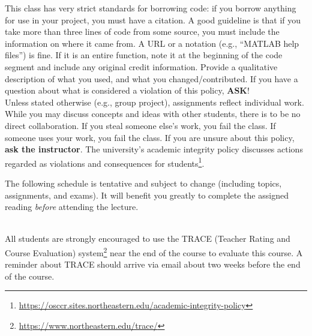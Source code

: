 \documentclass{neu_syllabus}
\begin{document}
This class has very strict standards for borrowing code: if you borrow anything for use in your project, you must have a citation.
A good guideline is that if you take more than three lines of code from some source, you must include the information on where it came from.
A URL or a notation (e.g., ``MATLAB help files'') is fine.
If it is an entire function, note it at the beginning of the code segment and include any original credit information.
Provide a qualitative description of what you used, and what you changed/contributed.
If you have a question about what is considered a violation of this policy, \textbf{ASK}!
\\

Unless stated otherwise (e.g., group project), assignments reflect individual work.
While you may discuss concepts and ideas with other students, there is to be no direct collaboration.
If you steal someone else's work, you fail the class.
If someone uses your work, you fail the class.
If you are unsure about this policy, \textbf{ask the instructor}.
The university's academic integrity policy discusses actions regarded as violations and consequences for students\footnote{\url{https://osccr.sites.northeastern.edu/academic-integrity-policy}}.

\newpage

\SyllabusClassroomEnvironment

\newpage

The following schedule is tentative and subject to change (including topics, assignments, and exams).
It will benefit you greatly to complete the assigned reading \textit{before} attending the lecture.
\\

\begin{SyllabusSchedule}
\end{SyllabusSchedule}
\\

All students are strongly encouraged to use the TRACE (Teacher Rating and Course Evaluation) system\footnote{\url{https://www.northeastern.edu/trace/}} near the end of the course to evaluate this course.
A reminder about TRACE should arrive via email about two weeks before the end of the course.
\end{document}
